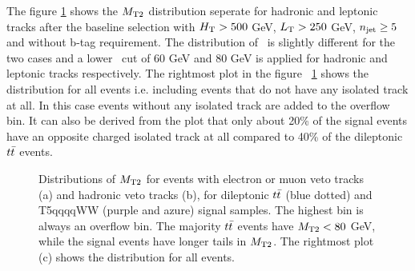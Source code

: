 The figure \ref{fig:track_mt2} shows the $M_\mathrm{T2}$ distribution seperate for hadronic and leptonic tracks after the baseline selection with $H_{\rm T} > 500$ GeV, $L_{\rm T} > 250$ GeV,  $n_{\rm jet} \geq 5$ and without b-tag requirement. The distribution of
\MTt\, is slightly different for the two cases and a lower \MTt\, cut of $60$ GeV and $80$ GeV is
applied for hadronic and leptonic tracks respectively. The rightmost plot in  the figure ~\ref{fig:track_mt2}
shows the \MTt\, distribution for all events i.e. including events that do not have any isolated track at
all. In this case events without any isolated track are added to the overflow bin. It can also be derived from the plot that only about 20\% of the signal events have an opposite charged isolated track at all compared to 40\% of the dileptonic $t\bar{t}$ events.
 \begin{figure}[!hbt]
    \begin{center}
  \caption{ \label{fig:track_mt2} Distributions of $M_\mathrm{T2}$ for events with electron or muon veto tracks (a) and hadronic veto tracks (b), for dileptonic $t\bar{t}$ (blue dotted) and T5qqqqWW (purple and azure) signal samples. The highest bin is always an overflow bin. The majority $t\bar{t}$ events have $M_\mathrm{T2} < 80$ GeV, while the signal events have longer
    tails in $M_\mathrm{T2}$.
    The rightmost plot (c) shows the distribution for all events. 
  }
   \end{center}
\end{figure}
